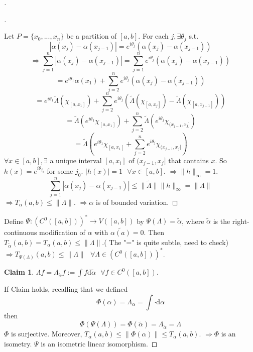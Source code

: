 \documentclass{article}
\newcommand{\sfa}{\text{  } \forall}
\theoremstyle{definition}
\newtheorem*{clm}{Claim}
\newenvironment{proofs}[1][\proofname]{%
  \begin{proof}[#1]$ $\par\nobreak\ignorespaces
}{%
  \end{proof}
}
\begin{document}
\begin{proofs}
	\begin{proofs}
		Let $P = \{x_0, ..., x_n\}$ be a partition of $[a, b]$.
		For each $j, \exists \theta_j$ s.t.
		\[
			|\alpha(x_j) - \alpha(x_{j - 1})| = e^{i \theta_j}(\alpha(x_j) - \alpha(x_{j - 1}))
		\]
		\[
			\Rightarrow \sum_{j = 1}^n |\alpha(x_j) - \alpha(x_{j - 1})| = \sum_{j = 1}^n e^{i \theta_j}(\alpha(x_j) - \alpha(x_{j - 1}))
		\]
		\[
			 = e^{i \theta_1} \alpha(x_1) + \sum_{j = 2}^n e^{i \theta_j} (\alpha(x_j) - \alpha(x_{j - 1}))
		 \]
		\[
			= e^{i \theta_1} \tilde{\Lambda}(\chi_{[a, x_1]}) + \sum_{j = 2}^n e^{i \theta_j}(\tilde{\Lambda}(\chi_{[a, x_j]}) - \tilde{\Lambda}(\chi_{[a, x_{j - 1}]}))
		\]
		\[
			= \tilde{\Lambda}(e^{i \theta_1} \chi_{[a, x_1]}) + \sum_{j = 2}^n \tilde{\Lambda}(e^{i \theta_j} \chi_{(x_{j - 1}, x_j]})
		\]
		\[
			= \tilde{\Lambda}(e^{i \theta_1} \chi_{[a, x_1]} + \sum_{j = 2}^n e^{i \theta_j} \chi_{(x_{j - 1}, x_j]})
		\]
		$\forall x \in [a, b], \exists$ a unique interval $[a,x_i]$ of $(x_{j - 1}, x_j]$ that contains $x$.
		So $h(x) = e^{i \theta_{j_0}}$ for some $j_0$.
		$|h(x)| = 1 \sfa x \in [a, b]$.
		$\Rightarrow \|h\|_{\infty} = 1$.
		\[
			\sum_{j = 1}^n |\alpha(x_j) - \alpha(x_{j - 1})| \leq \|\tilde{\Lambda}\|\|h\|_{\infty} = \|\Lambda\|
		\]
		$\Rightarrow T_\alpha(a, b) \leq \|\Lambda\|$.
		$\Rightarrow \alpha$ is of bounded variation.
	\end{proofs}
	Define $\Psi:(C^0([a, b]))^* \to V([a, b])$ by $\Psi(\Lambda) = \tilde{\alpha}$, where $\tilde{\alpha}$ is the right-continuous modification of $\alpha$ with $\tilde{\alpha(a)} = 0$.
	Then $T_{\tilde{\alpha}}(a, b) = T_\alpha(a, b) \leq \|\Lambda \|$.( The "=" is quite subtle, need to check)
	$\Rightarrow T_{\Psi(\Lambda)}(a, b) \leq \|\Lambda\| \sfa \Lambda \in (C^0([a, b]))^*$.
	\begin{clm}
		$\Lambda f = \Lambda_{\tilde{\alpha}} f := \int f \mathrm{d} \tilde{\alpha} \sfa f \in C^0([a, b])$.
	\end{clm}
	If Claim holds, recalling that we defined 
	\[
		\Phi(\alpha) = \Lambda_\alpha = \int \cdot \mathrm{d} \alpha
	\]
	then
	\[
		\Phi(\Psi(\Lambda)) = \Phi(\tilde{\alpha}) = \Lambda_{\tilde{\alpha}} = \Lambda
	\]
	$\Phi$ is surjective.
	Moreover, $T_\alpha(a, b) \leq \|\Phi(\alpha)\| \leq T_\alpha(a, b)$.
	$\Rightarrow \Phi$ is an isometry.
	$\Psi$ is an isometric linear isomorphism.


\end{proofs}
\end{document}

